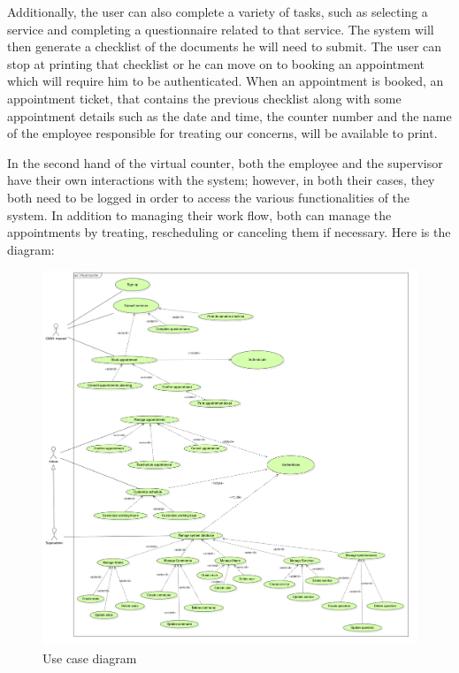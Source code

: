  Additionally, the user can also complete a variety of tasks, such as selecting a service and completing a questionnaire related to that service. The system will then generate a checklist of the documents he will need to submit. The user can stop at printing that checklist or he can move on to booking an appointment which will require him to be authenticated. When an appointment is booked, an appointment ticket, that contains the previous checklist along with some appointment details such as the date and time, the counter number and the name of the employee responsible for treating our concerns,  will be available to print. 
 
 \medskip In the second hand of the virtual counter, both the employee and the supervisor have their own interactions with the system; however, in both their cases, they both need to be logged in order to access the various functionalities of the system. In addition to managing their work flow, both can manage the appointments by treating, rescheduling or canceling them if necessary. 
\newpage
 \medskip Here is the diagram:

 \begin{figure}[H]
    \centering
    \includegraphics[width=1.0\textwidth]{UseCase.PNG}
    \caption{Use case diagram}

    \label{ucdiagram}
 \end{figure}
 \newpage
